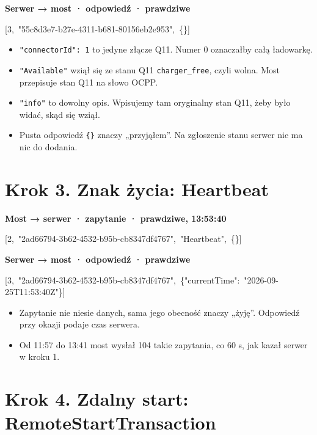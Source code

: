 \documentclass[11pt,a4paper]{article}
\begin{document}
\textbf{Serwer {\symbolfont→} most · odpowiedź ·  prawdziwe}


\begin{kodbox}
\mbox{}[3,\ "55c8d3e7-b27e-4311-b681-80156eb2e953",\ \{\}]
\end{kodbox}

\begin{itemize}
\item \texttt{"connectorId":\allowbreak{} 1} to jedyne złącze Q11. Numer 0 oznaczałby całą ładowarkę.
\item \texttt{"Available"} wziął się ze stanu Q11 \texttt{charger\_free}, czyli wolna. Most przepisuje stan Q11 na słowo OCPP.
\item \texttt{"info"} to dowolny opis. Wpisujemy tam oryginalny stan Q11, żeby było widać, skąd się wziął.
\item Pusta odpowiedź \texttt{\{\}} znaczy „przyjąłem”. Na zgłoszenie stanu serwer nie ma nic do dodania.
\end{itemize}

\section*{Krok 3. Znak życia: Heartbeat}

\textbf{Most {\symbolfont→} serwer · zapytanie ·  prawdziwe, 13:53:40}


\begin{kodbox}
\mbox{}[2,\ "2ad66794-3b62-4532-b95b-cb8347df4767",\ "Heartbeat",\ \{\}]
\end{kodbox}

\textbf{Serwer {\symbolfont→} most · odpowiedź ·  prawdziwe}


\begin{kodbox}
\mbox{}[3,\ "2ad66794-3b62-4532-b95b-cb8347df4767",\ \{"currentTime":\ "2026-09-25T11:53:40Z"\}]
\end{kodbox}

\begin{itemize}
\item Zapytanie nie niesie danych, sama jego obecność znaczy „żyję”. Odpowiedź przy okazji podaje czas serwera.
\item Od 11:57 do 13:41 most wysłał 104 takie zapytania, co 60 s, jak kazał serwer w kroku 1.
\end{itemize}

\section*{Krok 4. Zdalny start: RemoteStartTransaction}
\end{document}
